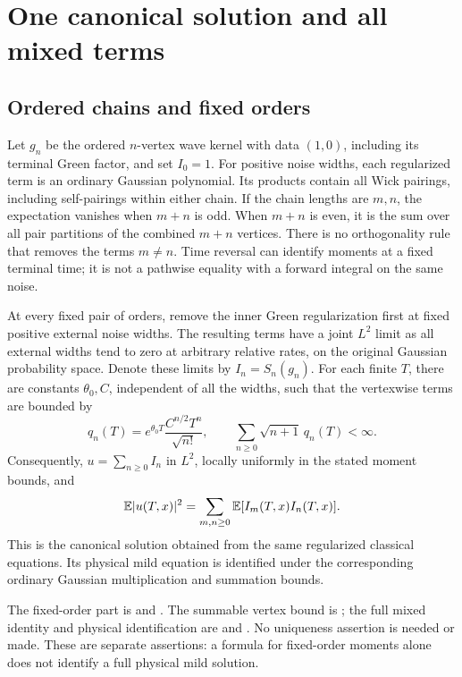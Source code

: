 \section{One canonical solution and all mixed
terms}\label{S:reader-construction}
\subsection{Ordered chains and fixed orders}

Let $g_n$ be the ordered $n$-vertex wave kernel with data $(1,0)$, including its
terminal Green factor, and set $I_0 = 1$. For positive noise widths, each
regularized term is an ordinary Gaussian polynomial. Its products contain all
Wick pairings, including self-pairings within either chain. If the chain lengths
are $m,n$, the expectation vanishes when $m+n$ is odd. When $m+n$ is even, it is
the sum over all pair partitions of the combined $m+n$ vertices. There is no
orthogonality rule that removes the terms $m \ne n$. Time reversal can identify
moments at a fixed terminal time; it is not a pathwise equality with a forward
integral on the same noise.

\begin{lemma}\label{L:reader-constructor}
  At every fixed pair of orders, remove the inner Green regularization first at
  fixed positive external noise widths. The resulting terms have a joint $L^2$
  limit as all external widths tend to zero at arbitrary relative rates, on the
  original Gaussian probability space. Denote these limits by $I_n = S_n(g_n)$.
  For each finite $T$, there are constants $\theta_0,C$, independent of all the
  widths, such that the vertexwise terms are bounded by
  \[
    q_n(T)=e^{\theta_0T}\frac{C^{n/2}T^n}{\sqrt{n!}},\qquad
    \sum_{n\ge0}\sqrt{n+1}\,q_n(T)<\infty.
  \]
  Consequently, $u = \sum_{n\ge0}I_n$ in $L^2$, locally uniformly in the stated
  moment bounds, and
  \begin{equation}\label{E:reader-mixed}
    \mathbb E|u(T,x)|^2=\sum_{m,n\ge0}\mathbb E[I_m(T,x)I_n(T,x)].
  \end{equation}
  This is the canonical solution obtained from the same regularized classical
  equations. Its physical mild equation is identified under the corresponding
  ordinary Gaussian multiplication and summation bounds.
\end{lemma}



The fixed-order part is  and
. The summable vertex bound is
; the full mixed identity and physical
identification are  and .
No uniqueness assertion is needed or made. These are separate assertions: a
formula for fixed-order moments alone does not identify a full physical mild
solution.


